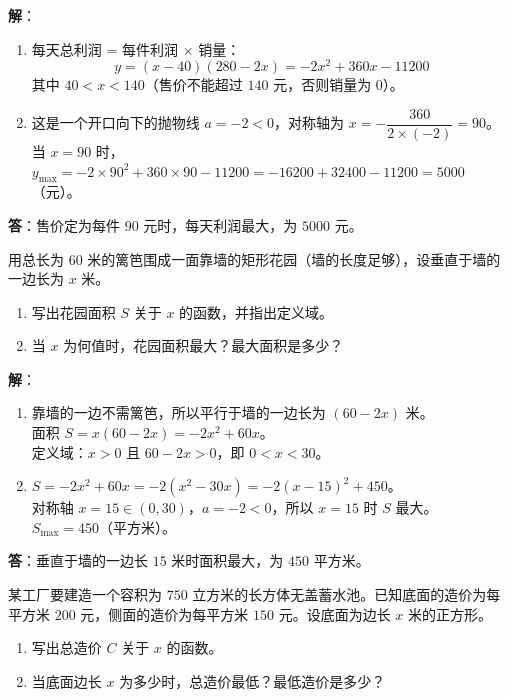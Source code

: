 \documentclass[12pt, a4paper]{ctexart}
\begin{document}
\textbf{解}：
\begin{enumerate}[label=(\arabic*)]
  \item 每天总利润 = 每件利润 $\times$ 销量：
    \[
      y = (x - 40)(280 - 2x) = -2x^2 + 360x - 11200
    \]
    其中 $40 < x < 140$（售价不能超过 $140$ 元，否则销量为 $0$）。
  \item 这是一个开口向下的抛物线 $a = -2 < 0$，对称轴为 $x = -\dfrac{360}{2 \times (-2)} = 90$。\\
    当 $x = 90$ 时，$y_{\max} = -2 \times 90^2 + 360 \times 90 - 11200 = -16200 + 32400 - 11200 = \boxed{5000}$（元）。
\end{enumerate}
\textbf{答}：售价定为每件 $90$ 元时，每天利润最大，为 $5000$ 元。

\begin{appbox}[【应用2】围栏面积问题]
用总长为 $60$ 米的篱笆围成一面靠墙的矩形花园（墙的长度足够），设垂直于墙的一边长为 $x$ 米。
\begin{enumerate}[label=(\arabic*)]
  \item 写出花园面积 $S$ 关于 $x$ 的函数，并指出定义域。
  \item 当 $x$ 为何值时，花园面积最大？最大面积是多少？
\end{enumerate}
\end{appbox}

\textbf{解}：
\begin{enumerate}[label=(\arabic*)]
  \item 靠墙的一边不需篱笆，所以平行于墙的一边长为 $(60 - 2x)$ 米。\\
    面积 $S = x(60 - 2x) = -2x^2 + 60x$。\\
    定义域：$x > 0$ 且 $60 - 2x > 0$，即 $0 < x < 30$。
  \item $S = -2x^2 + 60x = -2(x^2 - 30x) = -2(x - 15)^2 + 450$。\\
    对称轴 $x = 15 \in (0, 30)$，$a = -2 < 0$，所以 $x = 15$ 时 $S$ 最大。\\
    $S_{\max} = 450$（平方米）。
\end{enumerate}
\textbf{答}：垂直于墙的一边长 $15$ 米时面积最大，为 $\boxed{450}$ 平方米。

\begin{appbox}[【应用3】基本不等式解决实际问题]
某工厂要建造一个容积为 $750$ 立方米的长方体无盖蓄水池。已知底面的造价为每平方米 $200$ 元，侧面的造价为每平方米 $150$ 元。设底面为边长 $x$ 米的正方形。
\begin{enumerate}[label=(\arabic*)]
  \item 写出总造价 $C$ 关于 $x$ 的函数。
  \item 当底面边长 $x$ 为多少时，总造价最低？最低造价是多少？
\end{enumerate}
\end{appbox}
\end{document}
